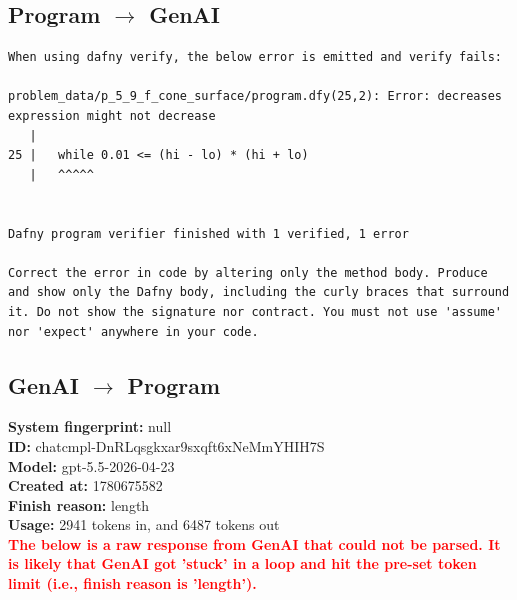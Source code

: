 \documentclass{article}
\begin{document}
\subsection*{Program $\rightarrow$ GenAI}
\begin{lstlisting}
When using dafny verify, the below error is emitted and verify fails:

problem_data/p_5_9_f_cone_surface/program.dfy(25,2): Error: decreases expression might not decrease
   |
25 |   while 0.01 <= (hi - lo) * (hi + lo)
   |   ^^^^^


Dafny program verifier finished with 1 verified, 1 error

Correct the error in code by altering only the method body. Produce and show only the Dafny body, including the curly braces that surround it. Do not show the signature nor contract. You must not use 'assume' nor 'expect' anywhere in your code.
\end{lstlisting}
\subsection*{GenAI $\rightarrow$ Program}
\textbf{System fingerprint: }null
\\\textbf{ID: }chatcmpl-DnRLqsgkxar9sxqft6xNeMmYHIH7S
\\\textbf{Model: }gpt-5.5-2026-04-23
\\\textbf{Created at: }1780675582
\\\textbf{Finish reason: }length
\\\textbf{Usage: }2941 tokens in, and 6487 tokens out
\\\textcolor{red}{\textbf{The below is a raw response from GenAI that could not be parsed. It is likely that GenAI got 'stuck' in a loop and hit the pre-set token limit (i.e., finish reason is 'length').}}
\begin{lstlisting}

\end{lstlisting}
\end{document}
